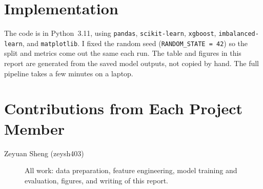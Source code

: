 \documentclass[journal]{vgtc}                %
\begin{document}
\section{Implementation}
The code is in Python~3.11, using \texttt{pandas}, \texttt{scikit-learn},
\texttt{xgboost}, \texttt{imbalanced-learn}, and \texttt{matplotlib}. I
fixed the random seed (\texttt{RANDOM\_STATE = 42}) so the split and
metrics come out the same each run. The table and figures in this report
are generated from the saved model outputs, not copied by hand. The full
pipeline takes a few minutes on a laptop.




\section*{Contributions from Each Project Member}\label{cont}

\begin{description}
\item[Zeyuan Sheng (zeysh403)] {All work: data preparation, feature
engineering, model training and evaluation, figures, and writing of
this report.}
\end{description}
\end{document}
